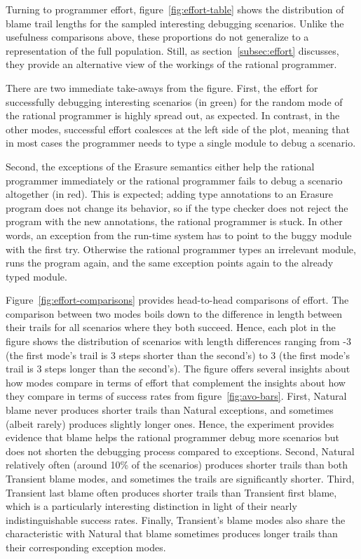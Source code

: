 Turning to programmer effort, figure~\ref{fig:effort-table} shows the
distribution of blame trail lengths for the sampled interesting debugging
scenarios. Unlike the usefulness comparisons above, these proportions do
not generalize to a representation of the full population.  Still, as
section~\ref{subsec:effort} discusses, they provide an alternative view of
the workings of the rational programmer. 

There are two immediate take-aways from the figure. First, the effort for
successfully debugging interesting scenarios (in green) for the random
mode of the rational programmer is highly spread out, as
expected. In contrast, in the other modes, successful effort coalesces at
the left side of the plot, meaning that in most cases the programmer needs
to type a single module to debug a scenario. 

Second, the exceptions of the Erasure semantics either help the rational
programmer immediately or the rational programmer fails to debug a scenario
altogether (in red).  This is expected; adding type annotations to an Erasure
program does not change its behavior, so if the type checker does not reject the
program with the new annotations, the rational programmer is stuck.  In other
words, an exception from the run-time system has to point to the buggy module with the
first try. Otherwise the rational programmer types an irrelevant module, runs
the program again, and the same exception points again to the already typed
module.

Figure~\ref{fig:effort-comparisons} provides head-to-head comparisons of
effort.  The comparison between two modes boils down to the difference in
length between their trails for all scenarios where they both succeed.
Hence, each plot in the figure shows the distribution of scenarios with
length differences ranging from -3 (the first mode's trail is 3 steps
shorter than the second's) to 3 (the first mode's trail is 3 steps longer
than the second's).  The figure offers several insights about how  modes
compare in terms of effort that complement the insights about how they
compare in terms of success rates from figure~\ref{fig:avo-bars}.  First,
Natural blame never produces shorter trails than Natural exceptions, and
sometimes (albeit rarely) produces slightly longer ones.  Hence, the
experiment provides evidence that blame helps the rational programmer
debug more scenarios but does not shorten the debugging process compared
to exceptions. Second, Natural relatively often (around 10\% of the
scenarios) produces shorter trails than both Transient blame modes, and
sometimes the trails are significantly shorter.  Third, Transient last
blame often produces shorter trails than Transient first blame, which is a
particularly interesting distinction in light of their nearly
indistinguishable success rates.  Finally, Transient's blame modes also
share the characteristic with Natural that blame sometimes produces longer
trails than their corresponding exception modes.

